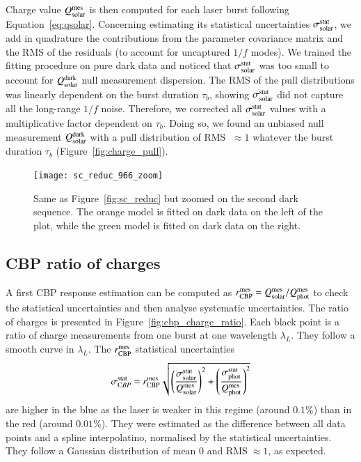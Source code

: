 Charge value $Q_{\mathrm{solar}}^{\mathrm{mes}}$ is then computed for each laser burst following Equation~\ref{eq:qsolar}. Concerning estimating its statistical uncertainties $\sigma_{\mathrm{solar}}^{\mathrm{stat}}$, we add in quadrature the contributions from the parameter covariance matrix and the RMS of the residuals (to account for uncaptured $1/f$ modes). We trained the fitting procedure on pure dark data and noticed that $\sigma_{\mathrm{solar}}^{\mathrm{stat}}$ was too small to account for $Q_{\mathrm{solar}}^{\rm dark}$ null measurement dispersion. The RMS of the pull distributions was linearly dependent on the burst duration $\tau_b$, showing $\sigma_{\mathrm{solar}}^{\mathrm{stat}}$ did not capture all the long-range $1/f$ noise. Therefore, we corrected all $\sigma_{\mathrm{solar}}^{\mathrm{stat}}$ values with a multiplicative factor dependent on $\tau_b$. Doing so, we found an unbiased null measurement $Q_{\mathrm{solar}}^{\rm dark}$ with a pull distribution of RMS $\;\approx 1$ whatever the burst duration $\tau_b$ (Figure~\ref{fig:charge_pull}). 

\begin{figure}[!h]
\centering
\texttt{[image: sc\_reduc\_966\_zoom]}
\caption{Same as Figure~\ref{fig:sc_reduc} but zoomed on the second dark sequence. The orange model is fitted on dark data on the left of the plot, while the green model is fitted on dark data on the right.}\label{fig:sc_reduc_zoom}
\end{figure}


\subsection{CBP ratio of charges}

A first CBP response estimation can be computed as $r_{\rm CBP}^{\rm mes} = Q_{\mathrm{solar}}^{\mathrm{mes}}/Q_{\mathrm{phot}}^{\mathrm{mes}}$ to check the statistical uncertainties and then analyse systematic uncertainties. The ratio of charges is presented in Figure~\ref{fig:cbp_charge_ratio}. Each black point is a ratio of charge measurements from one burst at one wavelength $\lambda_L$. They follow a smooth curve in $\lambda_L$. The $r_{\rm CBP}^{\rm mes}$ statistical uncertainties 
\begin{equation}
    \sigma_{\mathrm CBP}^{\rm stat} = r_{\rm CBP}^{\rm mes} \sqrt{\left(\frac{\sigma_{\mathrm{solar}}^{\mathrm{stat}}}{Q_{\mathrm{solar}}^{\mathrm{mes}}}\right)^2 +  \left(\frac{\sigma_{\mathrm{phot}}^{\mathrm{stat}}}{Q_{\mathrm{phot}}^{\mathrm{mes}}}\right)^2 }
\end{equation}
are higher in the blue as the laser is weaker in this regime (around $0.1\%$) than in the red (around $0.01\%$). They were estimated as the difference between all data points and a spline interpolatino, normalised by the statistical uncertainties. They follow a Gaussian distribution of mean 0 and RMS$\;\approx 1$, as expected. 

